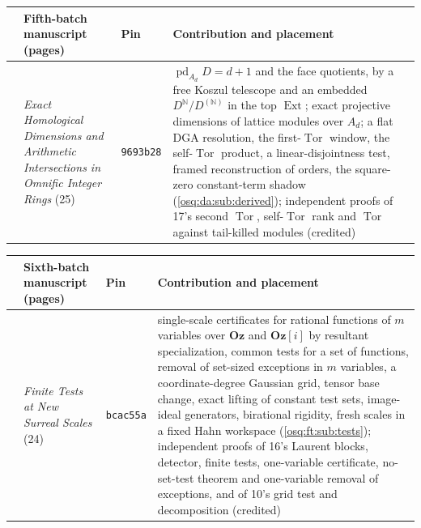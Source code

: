 \documentclass[11pt,letterpaper]{article}
\numberwithin{equation}{section}
\theoremstyle{definition}
\theoremstyle{remark}
\theoremstyle{plain}
\newcommand{\Oz}{\mathbf{Oz}}
\newcommand{\GOz}{\Oz[i]}
\newcommand{\N}{\mathbb N}
\newcommand{\Tor}{\operatorname{Tor}}
\newcommand{\Ext}{\operatorname{Ext}}
\newcommand{\pd}{\operatorname{pd}}
\begin{document}
\begin{center}\small
\begin{tabular}{@{}>{\raggedright\arraybackslash}p{}>{\raggedright\arraybackslash}p{}>{\raggedright\arraybackslash}p{}>{\raggedright\arraybackslash}p{}@{}}
\toprule
& Fifth-batch manuscript (pages) & Pin & Contribution and placement\\
\midrule
21 & \emph{Exact Homological Dimensions and Arithmetic Intersections in Omnific Integer Rings} (25) & \texttt{9693b28} & $\pd_{A_d}D=d+1$ and the face quotients, by a free Koszul telescope and an embedded $D^{\N}/D^{(\N)}$ in the top $\Ext$; exact projective dimensions of lattice modules over $A_d$; a flat DGA resolution, the first-$\Tor$ window, the self-$\Tor$ product, a linear-disjointness test, framed reconstruction of orders, the square-zero constant-term shadow (\cref{osq:da:sub:derived}); independent proofs of 17's second $\Tor$, self-$\Tor$ rank and $\Tor$ against tail-killed modules (credited)\\
\bottomrule
\end{tabular}
\end{center}

\begin{center}\small
\begin{tabular}{@{}>{\raggedright\arraybackslash}p{}>{\raggedright\arraybackslash}p{}>{\raggedright\arraybackslash}p{}>{\raggedright\arraybackslash}p{}@{}}
\toprule
& Sixth-batch manuscript (pages) & Pin & Contribution and placement\\
\midrule
22 & \emph{Finite Tests at New Surreal Scales} (24) & \texttt{bcac55a} & single-scale certificates for rational functions of $m$ variables over $\Oz$ and $\GOz$ by resultant specialization, common tests for a set of functions, removal of set-sized exceptions in $m$ variables, a coordinate-degree Gaussian grid, tensor base change, exact lifting of constant test sets, image-ideal generators, birational rigidity, fresh scales in a fixed Hahn workspace (\cref{osq:ft:sub:tests}); independent proofs of 16's Laurent blocks, detector, finite tests, one-variable certificate, no-set-test theorem and one-variable removal of exceptions, and of 10's grid test and decomposition (credited)\\
\bottomrule
\end{tabular}
\end{center}
\end{document}
